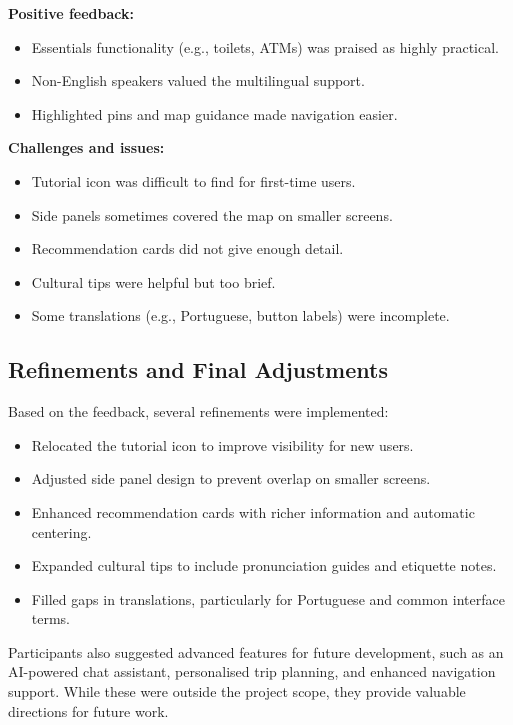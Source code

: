 \textbf{Positive feedback:}
\begin{itemize} \itemsep0pt \parskip0pt
    \item Essentials functionality (e.g., toilets, ATMs) was praised as highly practical.
    \item Non-English speakers valued the multilingual support.
    \item Highlighted pins and map guidance made navigation easier.
\end{itemize}

\textbf{Challenges and issues:}
\begin{itemize} \itemsep0pt \parskip0pt
    \item Tutorial icon was difficult to find for first-time users.
    \item Side panels sometimes covered the map on smaller screens.
    \item Recommendation cards did not give enough detail.
    \item Cultural tips were helpful but too brief.
    \item Some translations (e.g., Portuguese, button labels) were incomplete.
\end{itemize}

\subsection{Refinements and Final Adjustments}
Based on the feedback, several refinements were implemented:
\begin{itemize} \itemsep0pt \parskip0pt
    \item Relocated the tutorial icon to improve visibility for new users.
    \item Adjusted side panel design to prevent overlap on smaller screens.
    \item Enhanced recommendation cards with richer information and automatic centering.
    \item Expanded cultural tips to include pronunciation guides and etiquette notes.
    \item Filled gaps in translations, particularly for Portuguese and common interface terms.
\end{itemize}

Participants also suggested advanced features for future development, such as an AI-powered chat assistant, personalised trip planning, and enhanced navigation support. While these were outside the project scope, they provide valuable directions for future work.

